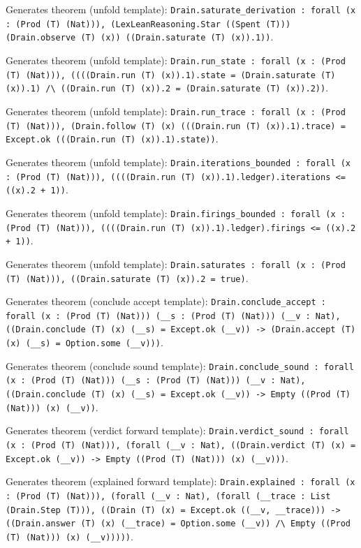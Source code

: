 \documentclass[11pt]{article}
\begin{document}
\noindent Generates theorem (unfold template): \texttt{Drain.saturate\_derivation : forall (x : (Prod (T) (Nat))), (LexLeanReasoning.Star ((Spent (T))) (Drain.observe (T) (x)) ((Drain.saturate (T) (x)).1))}.\par
\noindent Generates theorem (unfold template): \texttt{Drain.run\_state : forall (x : (Prod (T) (Nat))), ((((Drain.run (T) (x)).1).state = (Drain.saturate (T) (x)).1) /\textbackslash{} ((Drain.run (T) (x)).2 = (Drain.saturate (T) (x)).2))}.\par
\noindent Generates theorem (unfold template): \texttt{Drain.run\_trace : forall (x : (Prod (T) (Nat))), (Drain.follow (T) (x) (((Drain.run (T) (x)).1).trace) = Except.ok (((Drain.run (T) (x)).1).state))}.\par
\noindent Generates theorem (unfold template): \texttt{Drain.iterations\_bounded : forall (x : (Prod (T) (Nat))), ((((Drain.run (T) (x)).1).ledger).iterations <= ((x).2 + 1))}.\par
\noindent Generates theorem (unfold template): \texttt{Drain.firings\_bounded : forall (x : (Prod (T) (Nat))), ((((Drain.run (T) (x)).1).ledger).firings <= ((x).2 + 1))}.\par
\noindent Generates theorem (unfold template): \texttt{Drain.saturates : forall (x : (Prod (T) (Nat))), ((Drain.saturate (T) (x)).2 = true)}.\par
\noindent Generates theorem (conclude accept template): \texttt{Drain.conclude\_accept : forall (x : (Prod (T) (Nat))) (\_\_s : (Prod (T) (Nat))) (\_\_v : Nat), ((Drain.conclude (T) (x) (\_\_s) = Except.ok (\_\_v)) -> (Drain.accept (T) (x) (\_\_s) = Option.some (\_\_v)))}.\par
\noindent Generates theorem (conclude sound template): \texttt{Drain.conclude\_sound : forall (x : (Prod (T) (Nat))) (\_\_s : (Prod (T) (Nat))) (\_\_v : Nat), ((Drain.conclude (T) (x) (\_\_s) = Except.ok (\_\_v)) -> Empty ((Prod (T) (Nat))) (x) (\_\_v))}.\par
\noindent Generates theorem (verdict forward template): \texttt{Drain.verdict\_sound : forall (x : (Prod (T) (Nat))), (forall (\_\_v : Nat), ((Drain.verdict (T) (x) = Except.ok (\_\_v)) -> Empty ((Prod (T) (Nat))) (x) (\_\_v)))}.\par
\noindent Generates theorem (explained forward template): \texttt{Drain.explained : forall (x : (Prod (T) (Nat))), (forall (\_\_v : Nat), (forall (\_\_trace : List (Drain.Step (T))), ((Drain (T) (x) = Except.ok ((\_\_v, \_\_trace))) -> ((Drain.answer (T) (x) (\_\_trace) = Option.some (\_\_v)) /\textbackslash{} Empty ((Prod (T) (Nat))) (x) (\_\_v)))))}.\par
\end{document}
